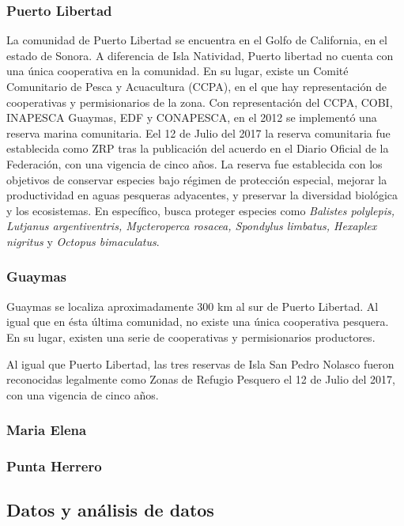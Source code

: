 \documentclass[12pt,]{article}
\begin{document}
\subsubsection{Puerto Libertad}\label{puerto-libertad}

La comunidad de Puerto Libertad se encuentra en el Golfo de California,
en el estado de Sonora. A diferencia de Isla Natividad, Puerto libertad
no cuenta con una única cooperativa en la comunidad. En su lugar, existe
un Comité Comunitario de Pesca y Acuacultura (CCPA), en el que hay
representación de cooperativas y permisionarios de la zona. Con
representación del CCPA, COBI, INAPESCA Guaymas, EDF y CONAPESCA, en el
2012 se implementó una reserva marina comunitaria. Eel 12 de Julio del
2017 la reserva comunitaria fue establecida como ZRP tras la publicación
del acuerdo en el Diario Oficial de la Federación, con una vigencia de
cinco años. La reserva fue establecida con los objetivos de conservar
especies bajo régimen de protección especial, mejorar la productividad
en aguas pesqueras adyacentes, y preservar la diversidad biológica y los
ecosistemas. En específico, busca proteger especies como \emph{Balistes
polylepis, Lutjanus argentiventris, Mycteroperca rosacea, Spondylus
limbatus, Hexaplex nigritus} y \emph{Octopus bimaculatus}.

\subsubsection{Guaymas}\label{guaymas}

Guaymas se localiza aproximadamente 300 km al sur de Puerto Libertad. Al
igual que en ésta última comunidad, no existe una única cooperativa
pesquera. En su lugar, existen una serie de cooperativas y
permisionarios productores.

Al igual que Puerto Libertad, las tres reservas de Isla San Pedro
Nolasco fueron reconocidas legalmente como Zonas de Refugio Pesquero el
12 de Julio del 2017, con una vigencia de cinco años.

\subsubsection{Maria Elena}\label{maria-elena}

\subsubsection{Punta Herrero}\label{punta-herrero}

\subsection{Datos y análisis de datos}\label{datos-y-analisis-de-datos}
\end{document}
